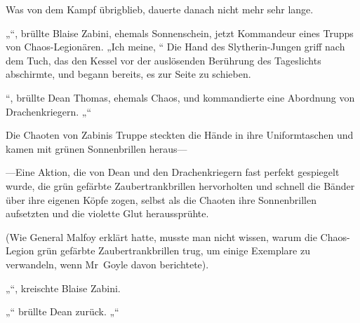 Was von dem Kampf übrigblieb, dauerte danach nicht mehr sehr lange.

\later

„“, brüllte Blaise Zabini, ehemals Sonnenschein, jetzt Kommandeur eines Trupps von Chaos-Legionären. „Ich meine, “ Die Hand des Slytherin-Jungen griff nach dem Tuch, das den Kessel vor der auslösenden Berührung des Tageslichts abschirmte, und begann bereits, es zur Seite zu schieben.

“, brüllte Dean Thomas, ehemals Chaos, und kommandierte eine Abordnung von Drachenkriegern. „“

Die Chaoten von Zabinis Truppe steckten die Hände in ihre Uniformtaschen und kamen mit grünen Sonnenbrillen heraus—

—Eine Aktion, die von Dean und den Drachenkriegern fast perfekt gespiegelt wurde, die grün gefärbte Zaubertrankbrillen hervorholten und schnell die Bänder über ihre eigenen Köpfe zogen, selbst als die Chaoten ihre Sonnenbrillen aufsetzten und die violette Glut heraussprühte.

(Wie General Malfoy erklärt hatte, musste man nicht wissen, warum die Chaos-Legion grün gefärbte Zaubertrankbrillen trug, um einige Exemplare zu verwandeln, wenn Mr~Goyle davon berichtete).

„“, kreischte Blaise Zabini.

„“ brüllte Dean zurück. „“

